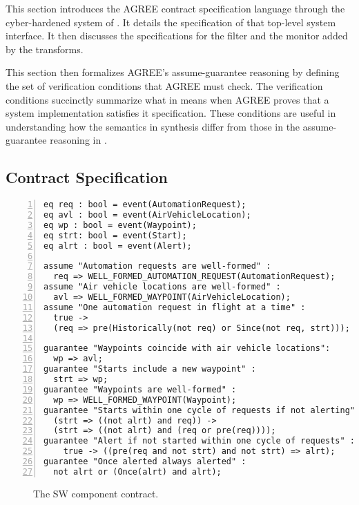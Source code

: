This section introduces the AGREE contract specification language through the cyber-hardened system of .
It details the specification of that top-level system interface.
It then discusses the specifications for the filter and the monitor added by the transforms.

This section then formalizes AGREE's assume-guarantee reasoning by defining the set of verification conditions that AGREE must check.
The verification conditions succinctly summarize what in means when AGREE proves that a system implementation satisfies it specification.
These conditions are useful in understanding how the semantics in synthesis differ from those in the assume-guarantee reasoning in .

\subsection{Contract Specification}
\newsavebox{\sw}
\begin{lrbox}{\sw}
\begin{lstlisting}[style=agree,numbers=left]
eq req : bool = event(AutomationRequest);
eq avl : bool = event(AirVehicleLocation);
eq wp : bool = event(Waypoint);
eq strt: bool = event(Start);
eq alrt : bool = event(Alert);

assume "Automation requests are well-formed" :
  req => WELL_FORMED_AUTOMATION_REQUEST(AutomationRequest);
assume "Air vehicle locations are well-formed" :
  avl => WELL_FORMED_WAYPOINT(AirVehicleLocation);    
assume "One automation request in flight at a time" :
  true -> 
  (req => pre(Historically(not req) or Since(not req, strt)));
      
guarantee "Waypoints coincide with air vehicle locations":
  wp => avl;
guarantee "Starts include a new waypoint" :
  strt => wp;
guarantee "Waypoints are well-formed" : 
  wp => WELL_FORMED_WAYPOINT(Waypoint);
guarantee "Starts within one cycle of requests if not alerting" :
  (strt => ((not alrt) and req)) -> 
  (strt => ((not alrt) and (req or pre(req))));
guarantee "Alert if not started within one cycle of requests" :
    true -> ((pre(req and not strt) and not strt) => alrt);
guarantee "Once alerted always alerted" :
  not alrt or (Once(alrt) and alrt);
\end{lstlisting}
\end{lrbox}

\begin{figure}
  \begin{center}
    \scalebox{0.62}{\usebox{\sw}}
  \end{center}
  \caption{The SW component contract.}
  \label{fig:sw}
\end{figure}

